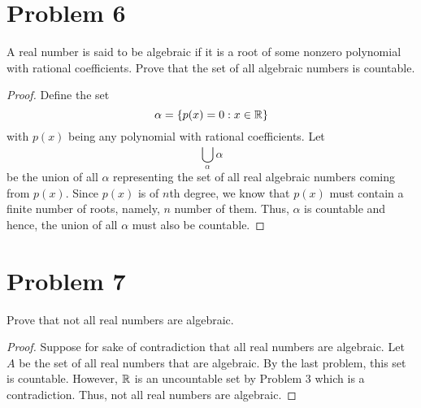 \documentclass[11pt,a4paper]{article}
\begin{document}
\section*{Problem 6} A real number is said to be algebraic if it is a root of some nonzero polynomial with rational coefficients. Prove that the set of all algebraic numbers is countable.
\begin{proof}
Define the set
\[  \alpha = \{ p(x) = 0 : x \in \mathbb{R}  \}  \] with \( p(x)  \) being any polynomial with rational coefficients. Let  
\[  \bigcup_{ \alpha  }^{  }  \alpha  \] be the union of all \( \alpha  \) representing the set of all real algebraic numbers coming from \( p(x) \). Since \( p(x) \) is of \( n \)th degree, we know that \( p(x) \) must contain a finite number of roots, namely, \( n  \) number of them. Thus, \( \alpha  \) is countable and hence, the union of all \( \alpha  \) must also be countable.  
\end{proof}

\section*{Problem 7} Prove that not all real numbers are algebraic.
\begin{proof}
    Suppose for sake of contradiction that all real numbers are algebraic. Let \( A  \) be the set of all real numbers that are algebraic. By the last problem, this set is countable. However, \( \mathbb{R}  \) is an uncountable set by Problem 3 which is a contradiction. Thus, not all real numbers are algebraic.  
\end{proof}
\end{document}
